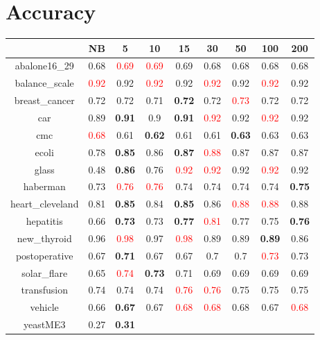 \documentclass{article}%
\begin{document}
%
\normalsize%
\section*{Accuracy}%
\begin{tabular}{c|cccccccc}%
\hline%
&NB&5&10&15&30&50&100&200\\%
\hline%
abalone16\_29&0.68&\textcolor{red}{ 
0.69
}&\textcolor{red}{ 
0.69
}&0.69&0.68&0.68&0.68&0.68\\%
\hline%
balance\_scale&\textcolor{red}{ 
0.92
}&0.92&\textcolor{red}{ 
0.92
}&0.92&\textcolor{red}{ 
0.92
}&0.92&\textcolor{red}{ 
0.92
}&0.92\\%
\hline%
breast\_cancer&0.72&0.72&0.71&\textbf{0.72}&0.72&\textcolor{red}{ 
0.73
}&0.72&0.72\\%
\hline%
car&0.89&\textbf{0.91}&0.9&\textbf{0.91}&\textcolor{red}{ 
0.92
}&0.92&\textcolor{red}{ 
0.92
}&0.92\\%
\hline%
cmc&\textcolor{red}{ 
0.68
}&0.61&\textbf{0.62}&0.61&0.61&\textbf{0.63}&0.63&0.63\\%
\hline%
ecoli&0.78&\textbf{0.85}&0.86&\textbf{0.87}&\textcolor{red}{ 
0.88
}&0.87&0.87&0.87\\%
\hline%
glass&0.48&\textbf{0.86}&0.76&\textcolor{red}{ 
0.92
}&\textcolor{red}{ 
0.92
}&0.92&\textcolor{red}{ 
0.92
}&0.92\\%
\hline%
haberman&0.73&\textcolor{red}{ 
0.76
}&\textcolor{red}{ 
0.76
}&0.74&0.74&0.74&0.74&\textbf{0.75}\\%
\hline%
heart\_cleveland&0.81&\textbf{0.85}&0.84&\textbf{0.85}&0.86&\textcolor{red}{ 
0.88
}&\textcolor{red}{ 
0.88
}&0.88\\%
\hline%
hepatitis&0.66&\textbf{0.73}&0.73&\textbf{0.77}&\textcolor{red}{ 
0.81
}&0.77&0.75&\textbf{0.76}\\%
\hline%
new\_thyroid&0.96&\textcolor{red}{ 
0.98
}&0.97&\textcolor{red}{ 
0.98
}&0.89&0.89&\textbf{0.89}&0.86\\%
\hline%
postoperative&0.67&\textbf{0.71}&0.67&0.67&0.7&0.7&\textcolor{red}{ 
0.73
}&0.73\\%
\hline%
solar\_flare&0.65&\textcolor{red}{ 
0.74
}&\textbf{0.73}&0.71&0.69&0.69&0.69&0.69\\%
\hline%
transfusion&0.74&0.74&0.74&\textcolor{red}{ 
0.76
}&\textcolor{red}{ 
0.76
}&0.75&0.75&0.75\\%
\hline%
vehicle&0.66&\textbf{0.67}&0.67&\textcolor{red}{ 
0.68
}&\textcolor{red}{ 
0.68
}&0.68&0.67&\textcolor{red}{ 
0.68
}\\%
\hline%
yeastME3&0.27&\textbf{0.31}&\textcolor{red}{ 
}
\end{tabular}
\end{document}
